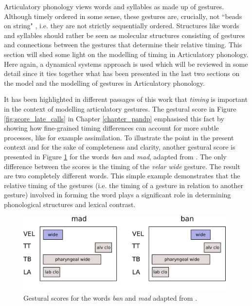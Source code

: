 Articulatory phonology views words and syllables as made up of gestures. Although timely ordered in some sense, these gestures are, crucially, not ``beads on string" \citep{Pouplier2011}, i.e. they are not strictly sequentially ordered. Structures like words and syllables should rather be seen as molecular structures \citep{NamGoldsteinSaltzman2009} consisting of gestures and connections between the gestures that determine their relative timing. This section will shed some light on the modelling of timing in Articulatory phonology. Here again, a dynamical systems approach is used which will be reviewed in some detail since it ties together what has been presented in the last two sections on the \citet{HakenKelsoBunz1985} model and the modelling of gestures in Articulatory phonology. 

It has been highlighted in different passages of this work that \emph{timing} is important in the context of  modelling articulatory gestures. The gestural score in Figure \ref{fig:score_late_calls} in Chapter \ref{chapter_pandp} emphasised this fact by showing how fine-grained timing differences can account for more subtle processes, like for example assimilation. To illustrate the point in the present context and for the sake of completeness and clarity, another gestural score is presented in Figure \ref{fig:ban_mad} for the words \emph{ban} and \emph{mad}, adapted from \citet{Goldsteinetal2009}. The only difference between the scores is the timing of the \emph{velar wide} gesture. The result are two completely different words. This simple example demonstrates that the relative timing of the gestures (i.e. the timing of a gesture in relation to another gesture) involved in forming the word plays a significant role in determining phonological structures and lexical contrast. 

\begin{figure}[htp]
\begin{center}
\includegraphics[width=11cm]{figures/ch3/ban_mad.pdf}
\caption{Gestural scores for the words \emph{ban} and \emph{mad} adapted from \citet{Goldsteinetal2009}.}
\label{fig:ban_mad}
\end{center}
\end{figure}


